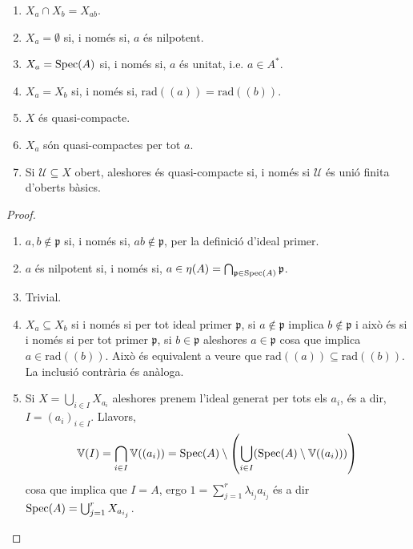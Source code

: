 \documentclass[../../../main.tex]{subfiles}
\begin{document}
\begin{prop}
\label{prop:obertsbasics} \begin{enumerate}[(1)]
    \item $X_a\cap X_b = X_{ab}$.
    \item $X_a = \emptyset$ si, i només si, $a$ és nilpotent.
    \item $X_a = \mathrm{Spec}(A)$ si, i només si, $a$ és unitat, i.e. $a\in A^*$.
    \item $X_a = X_b$ si, i només si, $\mathrm{rad}((a)) = \mathrm{rad}((b))$.
    \item $X$ és quasi-compacte.
    \item $X_a$ són quasi-compactes per tot $a$.
    \item Si $\mathcal{U}\subseteq X$ obert, aleshores és quasi-compacte si, i només si $\mathcal{U}$ és unió finita d'oberts bàsics.
\end{enumerate}
\end{prop}
\begin{proof}
\begin{enumerate}[(1)]
    \item $a,b\not\in\mathfrak{p}$ si, i només si, $ab\not\in\mathfrak{p}$, per la definició d'ideal primer.
    \item $a$ és nilpotent si, i només si,  $a\in\eta(A) = \bigcap_{\mathfrak{p}\in\mathrm{Spec}(A)}\mathfrak{p}$.
    \item Trivial.
    \item $X_a\subseteq X_b$ si i només si per tot ideal primer $\mathfrak{p}$, si $a\not\in\mathfrak{p}$ implica $b\not\in\mathfrak{p}$ i això és si i només si per tot primer $\mathfrak{p}$, si $b\in\mathfrak{p}$ aleshores $a\in\mathfrak{p}$ cosa que implica $a\in\mathrm{rad}((b))$. Això és equivalent a veure que $\mathrm{rad}((a))\subseteq \mathrm{rad}((b))$. La inclusió contrària és anàloga.
    \item Si $X = \bigcup_{i\in I} X_{a_i}$ aleshores prenem l'ideal generat per tots els $a_i$, és a dir, $I = (a_i)_{i\in I}$. Llavors,
    \begin{equation}
        \notag
        \mathbb{V}(I) = \bigcap_{i\in I} \mathbb{V}((a_i)) = \mathrm{Spec}(A)\setminus\left(\bigcup_{i\in I}(\mathrm{Spec}(A)\setminus\mathbb{V}((a_i)))\right)
    \end{equation}
    cosa que implica que $I = A$, ergo $1 = \sum_{j=1}^r \lambda_{i_j} a_{i_j}$ és a dir $\mathrm{Spec}(A) = \bigcup_{j=1}^r X_{a_{i_j}}$.
\end{enumerate}
\end{proof}
\end{document}
